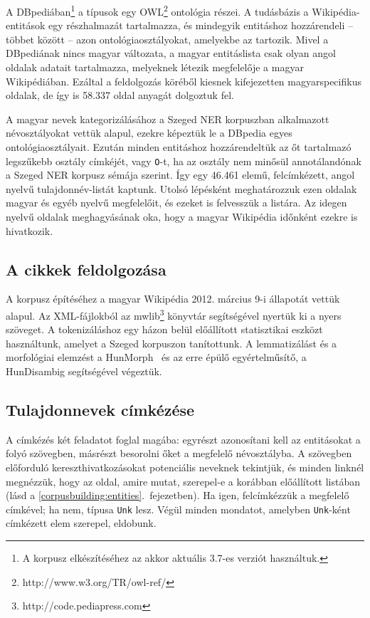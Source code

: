 \documentclass{llncs}
\begin{document}
A DBpediában\footnote{A korpusz elkészítéséhez az akkor aktuális 3.7-es verziót
használtuk.} a típusok egy OWL\footnote{http://www.w3.org/TR/owl-ref/}
ontológia részei. A tudásbázis a Wiki\-pé\-dia-entitások egy részhalmazát
tartalmazza, és mindegyik entitáshoz hozzárendeli -- többet között -- azon
ontológiaosztályokat, amelyekbe az tartozik. Mivel a DBpediának nincs magyar változata, 
a magyar entitáslista csak olyan angol oldalak adatait
tartalmazza, melyeknek létezik megfelelője a magyar Wikipédiában. 
Ezáltal a feldolgozás köréből kiesnek kifejezetten magyarspecifikus oldalak, de 
így is 58.337 oldal anyagát dolgoztuk fel. 

A magyar nevek kategorizálásához a Szeged NER \cite{Szarvas:06} korpuszban alkalmazott névosztályokat vettük alapul, ezekre képeztük le a DBpedia egyes ontológiaosztályait. 
Ezután minden entitáshoz hozzárendeltük az őt tartalmazó
legszűkebb osztály címkéjét, vagy \texttt{O}-t, ha az osztály nem minősül
annotálandónak a Szeged NER korpusz sémája szerint. Így egy 46.461 elemű,
felcímkézett, angol nyelvű tulajdonnév-listát kaptunk. Utolsó lépésként
meghatározzuk ezen oldalak magyar és egyéb nyelvű megfelelőit, és ezeket
is felvesszük a listára. Az idegen nyelvű oldalak meghagyásának oka, hogy
a magyar Wikipédia időnként ezekre is hivatkozik.

\subsection{A cikkek feldolgozása}

A korpusz építéséhez a magyar Wikipédia 2012. március 9-i állapotát vettük
alapul. Az XML-fájlokból az mwlib\footnote{http://code.pediapress.com}
könyvtár segítségével nyertük ki a nyers szöveget. 
A tokenizáláshoz egy házon belül előállított statisztikai eszközt használtunk, amelyet a Szeged korpuszon \cite{csendes} tanítottunk. 
A lemmatizálást és a morfológiai elemzést a
HunMorph~\cite{Tron:05} és az erre épülő egyértelműsítő, a HunDisambig
segítségével végeztük. %

\subsection{Tulajdonnevek címkézése}

A címkézés két feladatot foglal magába: egyrészt azonosítani kell az
entitásokat a folyó szövegben, másrészt besorolni őket a megfelelő
névosztályba. 
A szövegben előforduló kereszthivatkozásokat potenciális neveknek tekintjük, és minden
linknél megnézzük, hogy az oldal, amire mutat, szerepel-e a
korábban előállított listában (lásd a \ref{corpusbuilding:entities}.~fejezetben). Ha igen,
felcímkézzük a megfelelő címkével; ha nem, típusa \texttt{Unk} lesz. Végül
minden mondatot, amelyben \texttt{Unk}-ként címkézett elem szerepel, eldobunk.
\end{document}
